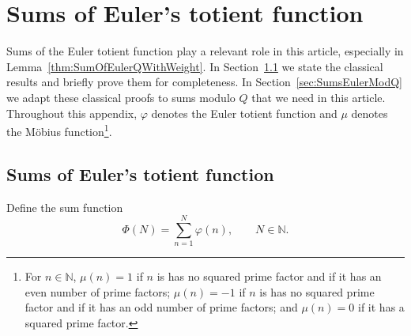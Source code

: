 \documentclass[11pt,reqno]{amsart}
\theoremstyle{definition}
\begin{document}
\appendix





\section{Sums of Euler's totient function}\label{sec:SumsEulerFunctions}
Sums of the Euler totient function play a relevant role in this article, 
especially in Lemma~\ref{thm:SumOfEulerQWithWeight}.
In Section~\ref{sec:SumsEulerClassical} we state the classical results
and briefly prove them for completeness.  
In Section~\ref{sec:SumsEulerModQ}
we adapt these classical proofs to sums modulo $Q$ that we need in this article.  
Throughout this appendix, $\varphi$ denotes the Euler totient function and $\mu$ denotes the M\"obius function\footnote{For $n \in \mathbb N$, $\mu(n) = 1$ if $n$ is has no squared prime factor and if it has an even number of prime factors; $\mu(n) = -1$ if $n$ is has no squared prime factor and if it has an odd number of prime factors; and $\mu(n) = 0$ if it has a squared prime factor.}.


\subsection{Sums of Euler's totient function}\label{sec:SumsEulerClassical}
Define the sum function
\begin{equation}\label{eq:EulerSumFunction}
\Phi(N) = \sum_{n=1}^N \varphi(n), \qquad N \in \mathbb N. 
\end{equation}
\end{document}
